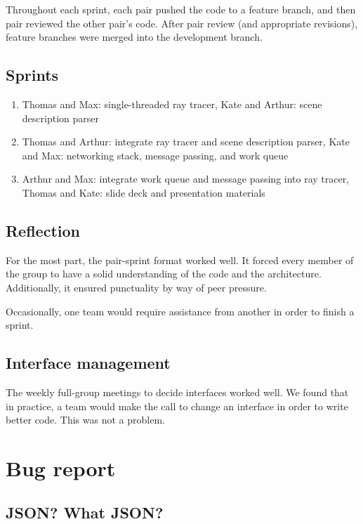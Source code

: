 \documentclass[letterpaper,twocolumn,10pt]{article}
\begin{document}
Throughout each sprint, each pair pushed the code to a feature branch, and
then pair reviewed the other pair's code. After pair review (and appropriate
revisions), feature branches were merged into the development branch.

\subsection{Sprints}

\begin{enumerate}[(1)]
\item Thomas and Max: single-threaded ray tracer, Kate and Arthur: scene
  description parser

\item Thomas and Arthur: integrate ray tracer and scene description parser, Kate
  and Max: networking stack, message passing, and work queue

\item Arthur and Max: integrate work queue and message passing into ray tracer,
  Thomas and Kate: slide deck and presentation materials
\end{enumerate}

\subsection{Reflection}

For the most part, the pair-sprint format worked well. It forced every member of
the group to have a solid understanding of the code and the architecture.
Additionally, it ensured punctuality by way of peer pressure.

Occasionally, one team would require assistance from another in order to finish
a sprint.

\subsection{Interface management}

The weekly full-group meetings to decide interfaces worked well. We found that
in practice, a team would make the call to change an interface in order to write
better code. This was not a problem.

\section{Bug report}

\subsection{JSON? What JSON?}
\end{document}
